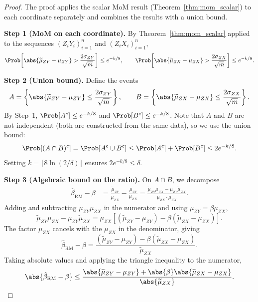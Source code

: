 \begin{proof}
The proof applies the scalar MoM result (Theorem~\ref{thm:mom_scalar}) to each coordinate separately and combines the results with a union bound.

\medskip\noindent\textbf{Step 1 (MoM on each coordinate).} By Theorem~\ref{thm:mom_scalar} applied to the sequences $(Z_iY_i)_{i=1}^{n}$ and $(Z_iX_i)_{i=1}^{n}$,
\[
    \Prob\!\left[\abs{\widetilde{\mu}_{ZY} - \mu_{ZY}} > \frac{2\sigma_{ZY}}{\sqrt{m}}\right] \leq e^{-k/8}, \qquad
    \Prob\!\left[\abs{\widetilde{\mu}_{ZX} - \mu_{ZX}} > \frac{2\sigma_{ZX}}{\sqrt{m}}\right] \leq e^{-k/8}.
\]

\medskip\noindent\textbf{Step 2 (Union bound).} Define the events
\[
    A = \left\{\abs{\widetilde{\mu}_{ZY} - \mu_{ZY}} \leq \frac{2\sigma_{ZY}}{\sqrt{m}}\right\}, \qquad B = \left\{\abs{\widetilde{\mu}_{ZX} - \mu_{ZX}} \leq \frac{2\sigma_{ZX}}{\sqrt{m}}\right\}.
\]
By Step~1, $\Prob[A^c] \leq e^{-k/8}$ and $\Prob[B^c] \leq e^{-k/8}$. Note that $A$ and $B$ are not independent (both are constructed from the same data), so we use the union bound:
\[
    \Prob[(A \cap B)^c] = \Prob[A^c \cup B^c] \leq \Prob[A^c] + \Prob[B^c] \leq 2e^{-k/8}.
\]
Setting $k = \lceil 8\ln(2/\delta)\rceil$ ensures $2e^{-k/8} \leq \delta$.

\medskip\noindent\textbf{Step 3 (Algebraic bound on the ratio).} On $A \cap B$, we decompose
\begin{align*}
    \hat{\beta}_{\mathrm{RM}} - \beta
    &= \frac{\widetilde{\mu}_{ZY}}{\widetilde{\mu}_{ZX}} - \frac{\mu_{ZY}}{\mu_{ZX}}
    = \frac{\widetilde{\mu}_{ZY}\mu_{ZX} - \mu_{ZY}\widetilde{\mu}_{ZX}}{\widetilde{\mu}_{ZX}\cdot\mu_{ZX}}.
\end{align*}
Adding and subtracting $\mu_{ZY}\mu_{ZX}$ in the numerator and using $\mu_{ZY} = \beta\mu_{ZX}$,
\[
    \widetilde{\mu}_{ZY}\mu_{ZX} - \mu_{ZY}\widetilde{\mu}_{ZX}
    = \mu_{ZX}\!\left[(\widetilde{\mu}_{ZY} - \mu_{ZY}) - \beta(\widetilde{\mu}_{ZX} - \mu_{ZX})\right].
\]
The factor $\mu_{ZX}$ cancels with the $\mu_{ZX}$ in the denominator, giving
\[
    \hat{\beta}_{\mathrm{RM}} - \beta = \frac{(\widetilde{\mu}_{ZY} - \mu_{ZY}) - \beta(\widetilde{\mu}_{ZX} - \mu_{ZX})}{\widetilde{\mu}_{ZX}}.
\]
Taking absolute values and applying the triangle inequality to the numerator,
\[
    \abs{\hat{\beta}_{\mathrm{RM}} - \beta} \leq \frac{\abs{\widetilde{\mu}_{ZY} - \mu_{ZY}} + \abs{\beta}\abs{\widetilde{\mu}_{ZX} - \mu_{ZX}}}{\abs{\widetilde{\mu}_{ZX}}}.
\]


\end{proof}
